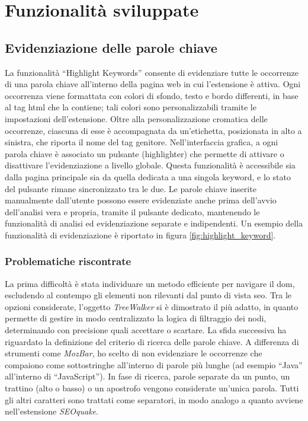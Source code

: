 \chapter{Funzionalità sviluppate}
\label{cap:funzionalità-sviluppate}

\section{Evidenziazione delle parole chiave}
\label{sec:highlight-keyword}

\par La funzionalità “Highlight Keywords” consente di evidenziare tutte le occorrenze di una parola chiave all’interno della pagina web in cui l’estensione è attiva. Ogni occorrenza viene formattata con colori di sfondo, testo e bordo differenti, in base al tag \gls{html} che la contiene; tali colori sono personalizzabili tramite le impostazioni dell’estensione. Oltre alla personalizzazione cromatica delle occorrenze, ciascuna di esse è accompagnata da un’etichetta, posizionata in alto a sinistra, che riporta il nome del tag genitore. Nell’interfaccia grafica, a ogni parola chiave è associato un pulsante (highlighter) che permette di attivare o disattivare l’evidenziazione a livello globale. Questa funzionalità è accessibile sia dalla pagina principale sia da quella dedicata a una singola keyword, e lo stato del pulsante rimane sincronizzato tra le due. Le parole chiave inserite manualmente dall'utente possono essere evidenziate anche prima dell’avvio dell’analisi vera e propria, tramite il pulsante dedicato, mantenendo le funzionalità di analisi ed evidenziazione separate e indipendenti. Un esempio della funzionalità di evidenziazione è riportato in figura \ref{fig:highlight_keyword}.

\subsection{Problematiche riscontrate}

\par La prima difficoltà è stata individuare un metodo efficiente per navigare il \gls{dom}, escludendo al contempo gli elementi non rilevanti dal punto di vista \gls{seo}. Tra le opzioni considerate, l’oggetto \textit{TreeWalker} si è dimostrato il più adatto, in quanto permette di gestire in modo centralizzato la logica di filtraggio dei nodi, determinando con precisione quali accettare o scartare. La sfida successiva ha riguardato la definizione del criterio di ricerca delle parole chiave. A differenza di strumenti come \textit{MozBar}, ho scelto di non evidenziare le occorrenze che compaiono come sottostringhe all’interno di parole più lunghe (ad esempio “Java” all’interno di “JavaScript”). In fase di ricerca, parole separate da un punto, un trattino (alto o basso) o un apostrofo vengono considerate un’unica parola. Tutti gli altri caratteri sono trattati come separatori, in modo analogo a quanto avviene nell’estensione \textit{SEOquake}.

